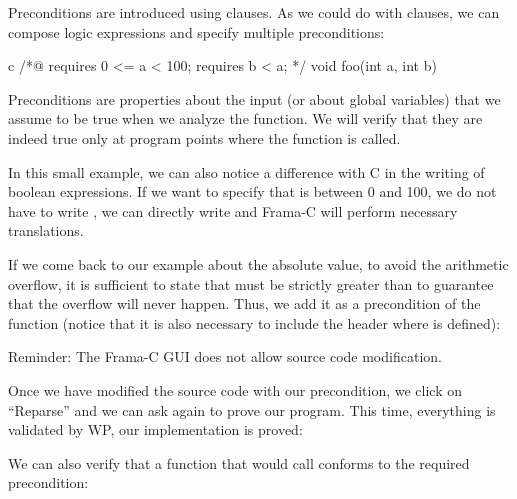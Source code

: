 


Preconditions are introduced using  clauses. As we
could do with  clauses, we can compose logic expressions
and specify multiple preconditions:



\begin{CodeBlock}{c}
/*@
  requires 0 <= a < 100;
  requires b < a;
*/
void foo(int a, int b){

}
\end{CodeBlock}



Preconditions are properties about the input (or about
global variables) that we assume to be true when we analyze the
function. We will verify that they are indeed true only at program
points where the function is called.



In this small example, we can also notice a difference with C in the
writing of boolean expressions. If we want to specify that  is
between 0 and 100, we do not have to write ,
we can directly write  and Frama-C will
perform necessary translations.



If we come back to our example about the absolute value, to avoid the
arithmetic overflow, it is sufficient to state that  must
be strictly greater than  to guarantee that the
overflow will never happen. Thus, we add it as a precondition of the
function (notice that it is also necessary to include the header where
 is defined):






\begin{Warning}
  Reminder: The Frama-C GUI does not allow source code modification.
\end{Warning}


Once we have modified the source code with our precondition, we click on
``Reparse'' and we can ask again to prove our program. This time,
everything is validated by WP, our implementation is proved:





We can also verify that a function that would call 
conforms to the required precondition:



